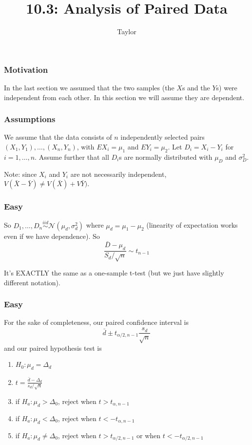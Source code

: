 \documentclass{beamer}
\title["10.3"]{10.3: Analysis of Paired Data}
\author{Taylor}
\institute[UVA] 
{
University of Virginia \\
\medskip
\textit{} 
}
\date{}
\begin{document}

\begin{frame}
\titlepage 
\end{frame}
\begin{frame}
\frametitle{Motivation}

In the last section we assumed that the two samples (the $X$s and the $Y$s) were independent from each other. In this section we will assume they are dependent.

\end{frame}
\begin{frame}
\frametitle{Assumptions}

We assume that the data consists of $n$ independently selected pairs $(X_1,Y_1),\ldots,(X_n,Y_n)$, with $EX_i = \mu_1$ and $EY_i = \mu_2$. Let $D_i = X_i - Y_i$ for $i =1, \ldots, n$. Assume further that all $D_i$s are normally distributed with $\mu_D$ and $\sigma^2_D$. 
\newline

Note: since $X_i$ and $Y_i$ are not necessarily independent, $V(\bar{X} - \bar{Y}) \neq V(\bar{X}) + V\bar{Y})$.



\end{frame}
\begin{frame}
\frametitle{Easy}

So $D_1, \ldots, D_n \overset{iid}{\sim} \mathcal{N}(\mu_d, \sigma_d^2)$ where $\mu_d = \mu_1 - \mu_2$ (linearity of expectation works even if we have dependence). So
\[
\frac{\bar{D} - \mu_d}{S_d/\sqrt{n}} \sim t_{n-1}
\]

It's EXACTLY the same as a one-sample t-test (but we just have slightly different notation).

\end{frame}
\begin{frame}
\frametitle{Easy}

For the sake of completeness, our paired confidence interval is 
\[
\bar{d} \pm t_{\alpha/2,n-1} \frac{s_d}{\sqrt{n}}
\]
and our paired hypothesis test is
\begin{enumerate}
\item $H_0: \mu_d = \Delta_d$
\item $t = \frac{\bar{d} - \Delta_d}{s_d / \sqrt{n}}$
\item if $H_a: \mu_d > \Delta_0$, reject when $t > t_{\alpha, n-1}$
\item if $H_a: \mu_d < \Delta_0$, reject when $t < -t_{\alpha, n-1}$
\item if $H_a: \mu_d \neq \Delta_0$, reject when $t > t_{\alpha/2, n-1}$ or when $t < - t_{\alpha/2,n-1}$
\end{enumerate}
\end{frame}
\end{document}
